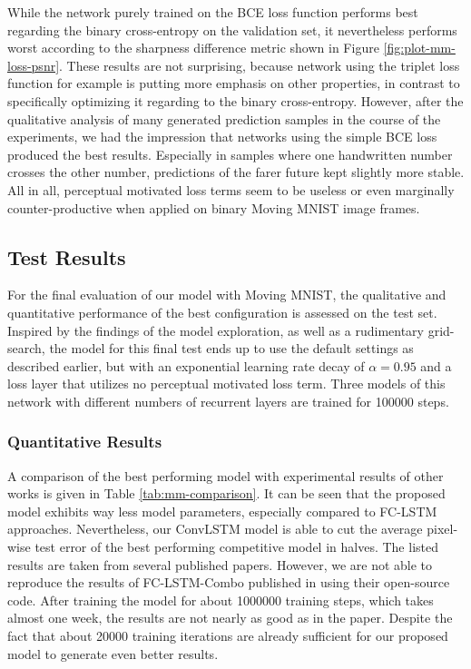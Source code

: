 While the network purely trained on the BCE loss function performs best regarding the binary cross-entropy on the validation set, it nevertheless performs worst according to the sharpness difference metric shown in Figure \ref{fig:plot-mm-loss-psnr}. These results are not surprising, because network using the triplet loss function for example is putting more emphasis on other properties, in contrast to specifically optimizing it regarding to the binary cross-entropy. However, after the qualitative analysis of many generated prediction samples in the course of the experiments, we had the impression that networks using the simple BCE loss produced the best results. Especially in samples where one handwritten number crosses the other number, predictions of the farer future kept slightly more stable. All in all, perceptual motivated loss terms seem to be useless or even marginally counter-productive when applied on binary Moving MNIST image frames. 

\subsection{Test Results}

For the final evaluation of our model with Moving MNIST, the qualitative and quantitative performance of the best configuration is assessed on the test set. Inspired by the findings of the model exploration, as well as a rudimentary grid-search, the model for this final test ends up to use the default settings as described earlier, but with an exponential learning rate decay of $\alpha=0.95$ and a loss layer that utilizes no perceptual motivated loss term. Three models of this network with different numbers of recurrent layers are trained for \num{100000} steps.


\subsubsection{Quantitative Results}

A comparison of the best performing model with experimental results of other works is given in Table \ref{tab:mm-comparison}. It can be seen that the proposed model exhibits way less model parameters, especially compared to FC-LSTM approaches. Nevertheless, our ConvLSTM model is able to cut the average pixel-wise test error of the best performing competitive model in halves. The listed results are taken from several published papers. However, we are not able to reproduce the results of FC-LSTM-Combo published in \parencite{unsup_learn_lstm} using their open-source code. After training the model for about \num{1000000} training steps, which takes almost one week, the results are not nearly as good as in the paper. Despite the fact that about \num{20000} training iterations are already sufficient for our proposed model to generate even better results.

